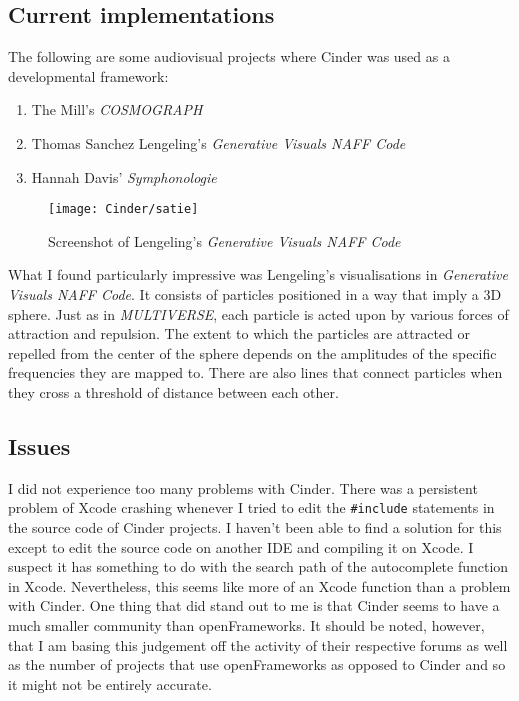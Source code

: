 \documentclass[../main_frameworkreview.tex]{subfiles}
\begin{document}
\subsection{Current implementations}
The following are some audiovisual projects where Cinder was used as a developmental framework:
\begin{enumerate}
\item The Mill's \textit{COSMOGRAPH}\cite{TheMill}
\item Thomas Sanchez Lengeling's \textit{Generative Visuals NAFF Code}\cite{Lengeling}
\item Hannah Davis' \textit{Symphonologie}\cite{HannahDavis2016}
\end{enumerate}
\begin{figure}
  \texttt{[image: Cinder/satie]}
  \caption{Screenshot of Lengeling's \textit{Generative Visuals NAFF Code}}
\end{figure}
What I found particularly impressive was Lengeling's visualisations in \textit{Generative Visuals NAFF Code}. It consists of particles positioned in a way that imply a 3D sphere. Just as in \textit{MULTIVERSE}, each particle is acted upon by various forces of attraction and repulsion. The extent to which the particles are attracted or repelled from the center of the sphere depends on the amplitudes of the specific frequencies they are mapped to.\cite{Sanchez} There are also lines that connect particles when they cross a threshold of distance between each other.

\subsection{Issues}
I did not experience too many problems with Cinder. There was a persistent problem of Xcode crashing whenever I tried to edit the \verb|#include| statements in the source code of Cinder projects. I haven't been able to find a solution for this except to edit the source code on another IDE and compiling it on Xcode. I suspect it has something to do with the search path of the autocomplete function in Xcode. Nevertheless, this seems like more of an Xcode function than a problem with Cinder. One thing that did stand out to me is that Cinder seems to have a much smaller community than openFrameworks. It should be noted, however, that I am basing this judgement off the activity of their respective forums as well as the number of projects that use openFrameworks as opposed to Cinder and so it might not be entirely accurate.
\end{document}
